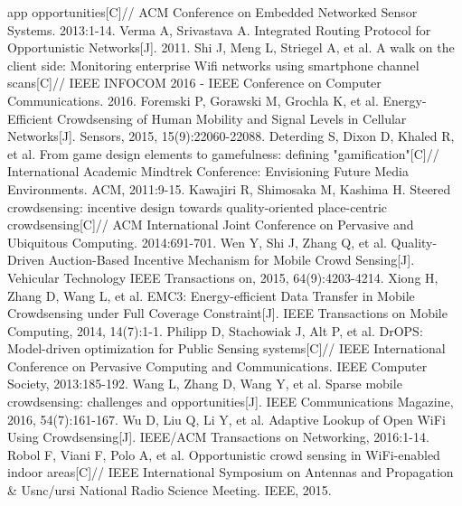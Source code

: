 \documentclass[UTF8]{ctexart}
\begin{document}
\begin{thebibliography}{99}
  app opportunities[C]// ACM Conference on Embedded Networked Sensor Systems. 2013:1-14.
   Verma A, Srivastava A. Integrated Routing Protocol for Opportunistic Networks[J]. 2011.
   Shi J, Meng L, Striegel A, et al. A walk on the client side: Monitoring enterprise Wifi networks using smartphone channel scans[C]// IEEE
  INFOCOM 2016 - IEEE Conference on Computer Communications. 2016.
   Foremski P, Gorawski M, Grochla K, et al. Energy-Efficient Crowdsensing of Human Mobility and Signal Levels in Cellular Networks[J]. Sensors,
  2015, 15(9):22060-22088.
   Deterding S, Dixon D, Khaled R, et al. From game design elements to gamefulness: defining "gamification"[C]// International Academic Mindtrek
  Conference: Envisioning Future Media Environments. ACM, 2011:9-15.
   Kawajiri R, Shimosaka M, Kashima H. Steered crowdsensing: incentive design towards quality-oriented place-centric crowdsensing[C]// ACM
  International Joint Conference on Pervasive and Ubiquitous Computing. 2014:691-701.
   Wen Y, Shi J, Zhang Q, et al. Quality-Driven Auction-Based Incentive Mechanism for Mobile Crowd Sensing[J]. Vehicular Technology IEEE
  Transactions on, 2015, 64(9):4203-4214.
   Xiong H, Zhang D, Wang L, et al. EMC3: Energy-efficient Data Transfer in Mobile Crowdsensing under Full Coverage Constraint[J]. IEEE
  Transactions on Mobile Computing, 2014, 14(7):1-1.
   Philipp D, Stachowiak J, Alt P, et al. DrOPS: Model-driven optimization for Public Sensing systems[C]// IEEE International Conference on
  Pervasive Computing and Communications. IEEE Computer Society, 2013:185-192.
   Wang L, Zhang D, Wang Y, et al. Sparse mobile crowdsensing: challenges and opportunities[J]. IEEE Communications Magazine, 2016, 54(7):161-167.
   Wu D, Liu Q, Li Y, et al. Adaptive Lookup of Open WiFi Using Crowdsensing[J]. IEEE/ACM Transactions on Networking, 2016:1-14.
   Robol F, Viani F, Polo A, et al. Opportunistic crowd sensing in WiFi-enabled indoor areas[C]// IEEE International Symposium on Antennas and
  Propagation \& Usnc/ursi National Radio Science Meeting. IEEE, 2015.


\end{thebibliography}
\end{document}
